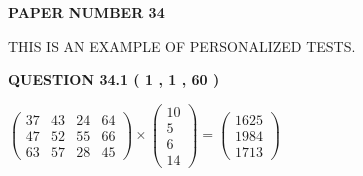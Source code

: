 \documentclass[12pt]{article}
\begin{document}
   
   
   
 {\textbf{ \Large{ PAPER NUMBER           34  }}}
   
   
\vspace{0.2in}
   
   
   
   
   
   
 \vspace{0.2in}
{\Huge  THIS IS AN EXAMPLE OF}
{\Huge  PERSONALIZED TESTS. }
   
   
  
\vspace{0.2in}
  
{\textbf{\Large{QUESTION
34.1 
 (           1 ,           1 ,          60 )
}}}
  
  
 
 
\noindent{}

 
$\left( \begin{array}{ccccccccccccccc}
          37  & 
          43  & 
          24  & 
          64  \\ 
          47  & 
          52  & 
          55  & 
          66  \\ 
          63  & 
          57  & 
          28  & 
          45
\end{array}\right) \times
\left( \begin{array}{c}
          10  \\ 
           5  \\ 
           6  \\ 
          14
\end{array}\right)  =
\left( \begin{array}{c}
        1625  \\ 
        1984  \\ 
        1713
\end{array}\right)  $
 
\end{document}
